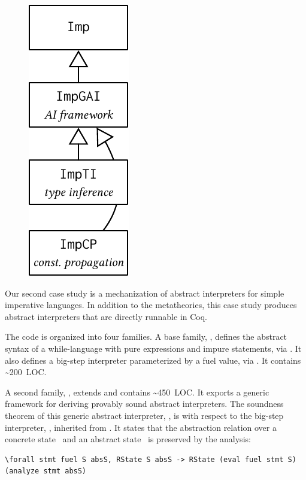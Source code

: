 
\begin{figure}
\includegraphics[scale=.68]{graphics/ai-casestudy.pdf}
\end{figure}

Our second case study is a mechanization of abstract interpreters
for simple imperative languages.
In addition to the metatheories, this case study produces abstract
interpreters that are directly runnable in Coq.

The code is organized into four families.
A base family, , defines the abstract syntax of a while-language
with pure expressions and impure statements, via .
It also defines a big-step interpreter parameterized by a fuel value,
via .
It contains \textasciitilde 200~LOC.

A second family, , extends  and contains
\textasciitilde 450~LOC.
It exports a generic framework for deriving provably sound
abstract interpreters.
The soundness theorem of this generic abstract interpreter, ,
is with respect to the big-step interpreter, , inherited from .
It states that the abstraction relation  over a
concrete state~ and an abstract state~ is preserved
by the analysis:

\begin{centered}
\begin{minipage}{.86\textwidth}
\begin{lstlisting}[basicstyle=\fontsize{8.25}{9}\ttfamily]
\forall stmt fuel S absS, RState S absS -> RState (eval fuel stmt S) (analyze stmt absS)
\end{lstlisting}
\end{minipage}
\end{centered}

